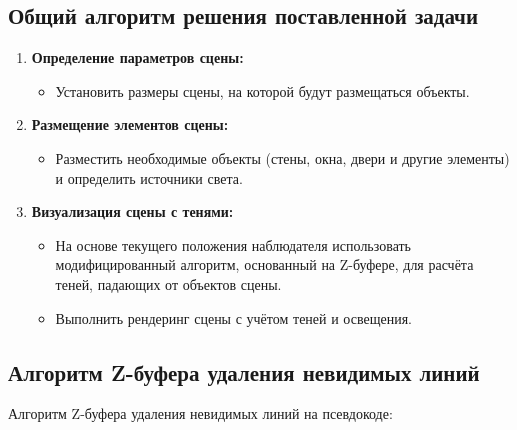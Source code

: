 \subsection{Общий алгоритм решения поставленной задачи}

\begin{enumerate}
    \item \textbf{Определение параметров сцены:}
    \begin{itemize}
        \item Установить размеры сцены, на которой будут размещаться объекты.
    \end{itemize}
    
    \item \textbf{Размещение элементов сцены:}
    \begin{itemize}
        \item Разместить необходимые объекты (стены, окна, двери и другие элементы) и определить источники света.
    \end{itemize}
    
    \item \textbf{Визуализация сцены с тенями:}
    \begin{itemize}
        \item На основе текущего положения наблюдателя использовать модифицированный алгоритм, основанный на Z-буфере, для расчёта теней, падающих от объектов сцены.
        \item Выполнить рендеринг сцены с учётом теней и освещения.
    \end{itemize}
\end{enumerate}


\subsection{Алгоритм Z-буфера удаления невидимых линий}
\label{subsection:algo_Zbuff}

\hspace{1.25cm}
Алгоритм Z-буфера удаления невидимых линий на псевдокоде:

